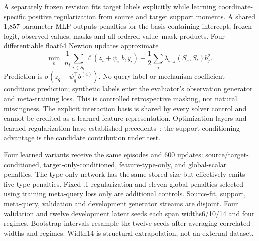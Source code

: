 \documentclass[10pt]{article}
\begin{document}
A separately frozen revision fits target labels explicitly while learning coordinate-specific positive regularization from source and target support moments. A shared 1,857-parameter MLP outputs penalties for the basis containing intercept, frozen logit, observed values, masks and all ordered value--mask products. Four differentiable float64 Newton updates approximate
\begin{equation}
 \min_b\;\frac{1}{n_t}\sum_{i\in S_t}\ell(z_i+\psi_i^\top b,y_i)
 +\frac{1}{2}\sum_j\lambda_{\omega,j}(S_s,S_t)b_j^2.
\end{equation}
Prediction is $\sigma(z_q+\psi_q^\top b^{(4)})$. No query label or mechanism coefficient conditions prediction; synthetic labels enter the evaluator's observation generator and meta-training loss. This is controlled retrospective masking, not natural missingness. The explicit interaction basis is shared by every solver control and cannot be credited as a learned feature representation. Optimization layers and learned regularization have established precedents~\cite{r2d2,metaoptnet,metareg}; the support-conditioning advantage is the candidate contribution under test.

Four learned variants receive the same episodes and 600 updates: source/target-conditioned, target-only-conditioned, feature-type-only, and global-scalar penalties. The type-only network has the same stored size but effectively emits five type penalties. Fixed .1 regularization and eleven global penalties selected using training meta-query loss only are additional controls. Source-fit, support, meta-query, validation and development generator streams are disjoint. Four validation and twelve development latent seeds each span widths6/10/14 and four regimes. Bootstrap intervals resample the twelve seeds after averaging correlated widths and regimes. Width14 is structural extrapolation, not an external dataset.
\end{document}
